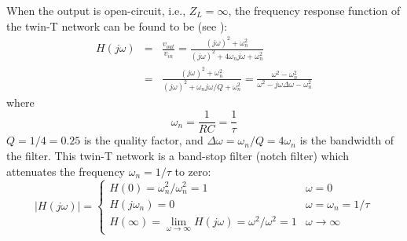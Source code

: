 \documentclass{article}
\begin{document}
\begin{comment}

As these two $\pi$-networks are combined in parallel, they form a single
$\pi$-network with three branches $Z_1=Z'_1||Z''_1$, $Z_2=Z'_2||Z''_2$, 
and $Z_3=Z'_3||Z''_3$:
\begin{equation}
Z_1=Z'_1||Z''_1=Z_2=Z'_2||Z''_2=\frac{1}{2}\left(R+\frac{1}{j\omega C}\right)
\end{equation}
\begin{equation}
  Z_3=Z'_3||Z''_3=\frac{Z'_3 Z''_3}{Z'_3+Z''_3}
  =\frac{2R(1+j\omega RC)}{1+(j\omega RC)^2}
\end{equation}
The frequency response function of this $\pi$-network (a voltage divider) is:
\begin{eqnarray}
  H(j\omega)&=&\frac{Z_2}{Z_2+Z_3}=\frac{R+1/j\omega C}
  {R+1/j\omega C+4R(1+j\omega RC)/(1+(j\omega RC)^2)}
  \nonumber \\
  &=&\frac{(1+j\omega RC)/j\omega C}{(1+j\omega RC)/j\omega C+4R(1+j\omega RC)/(1+(j\omega RC)^2)}
  \nonumber \\
  &=&\frac{1/j\omega C}{1/j\omega C+4R/(1+(j\omega RC)^2)}
  =\frac{1}{1+4j\omega RC/(1+(j\omega RC)^2)}
  \nonumber \\
  &=&\frac{1+(j\omega\tau)^2}{1+(j\omega\tau)^2+4j\omega\tau}
  =\frac{(j\omega)^2+(1/\tau)^2}{(j\omega)^2+4j\omega/\tau+(1/\tau)^2}
\end{eqnarray}

\end{comment}

When the output is open-circuit, i.e., $Z_L=\infty$, the frequency 
response function of the twin-T network can be found to be
(see ):
\begin{eqnarray}
  H(j\omega)&=&\frac{v_{out}}{v_{in}}
  =\frac{(j\omega)^2+\omega_n^2}{(j\omega)^2+4\omega_nj\omega+\omega_n^2}
  \nonumber\\
  &=&\frac{(j\omega)^2+\omega_n^2}{(j\omega)^2+\omega_nj\omega/Q+\omega_n^2}
  =\frac{\omega^2-\omega_n^2}{\omega^2-j\omega\Delta\omega-\omega_n^2}
\end{eqnarray}
where
\begin{equation}
\omega_n=\frac{1}{RC}=\frac{1}{\tau}
\end{equation}
$Q=1/4=0.25$ is the quality factor, and $\Delta\omega=\omega_n/Q=4\omega_n$ 
is the bandwidth of the filter. This twin-T network is a band-stop filter 
(notch filter) which attenuates the frequency $\omega_n=1/\tau$ to zero:
\begin{equation}
|H(j\omega)|=\left\{\begin{array}{ll} 
H(0)=\omega_n^2/\omega_n^2=1 & \omega=0 \\
H(j\omega_n)=0 & \omega=\omega_n=1/\tau\\
H(\infty)=\lim\limits_{\omega\rightarrow\infty}H(j\omega)=\omega^2/\omega^2=1 & \omega\rightarrow \infty
\end{array}\right.
\end{equation}
\end{document}
